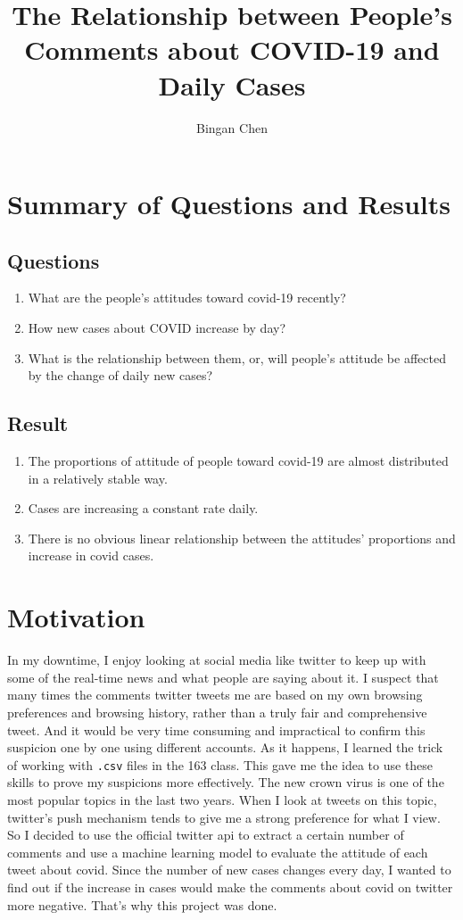 \documentclass[a4paper, 12pt]{article}
\title{The Relationship between People's Comments about COVID-19 and Daily Cases}
\author{Bingan Chen}
\begin{document}
\doublespacing

\maketitle

\section*{Summary of Questions and Results}
\subsection*{Questions}
\begin{enumerate}
    \item What are the people's attitudes toward covid-19 recently?
    \item How new cases about COVID increase by day?
    \item What is the relationship between them, or, will people’s attitude be affected by the change of daily new cases?
\end{enumerate}
\subsection*{Result}
\begin{enumerate}
    \item The proportions of attitude of people toward covid-19 are almost distributed in a relatively stable way.
    \item Cases are increasing a constant rate daily.
    \item There is no obvious linear relationship between the attitudes' proportions and increase in covid cases.
\end{enumerate}

\section*{Motivation}
In my downtime, I enjoy looking at social media like twitter to keep up with some of the real-time news and what people are saying about it. I suspect that many times the comments twitter tweets me are based on my own browsing preferences and browsing history, rather than a truly fair and comprehensive tweet. And it would be very time consuming and impractical to confirm this suspicion one by one using different accounts. As it happens, I learned the trick of working with \texttt{.csv} files in the 163 class. This gave me the idea to use these skills to prove my suspicions more effectively. The new crown virus is one of the most popular topics in the last two years. When I look at tweets on this topic, twitter's push mechanism tends to give me a strong preference for what I view. So I decided to use the official twitter api to extract a certain number of comments and use a machine learning model to evaluate the attitude of each tweet about covid. Since the number of new cases changes every day, I wanted to find out if the increase in cases would make the comments about covid on twitter more negative. That's why this project was done.
\end{document}
